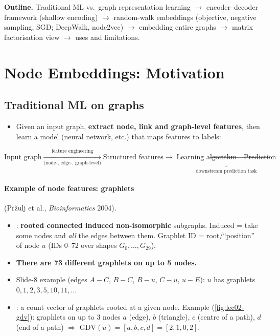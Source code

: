 \label{ch:lec02}

\textbf{Outline.} Traditional ML vs.\ graph representation learning $\to$
encoder--decoder framework (shallow encoding) $\to$ random-walk embeddings
(objective, negative sampling, SGD; DeepWalk, node2vec) $\to$ embedding entire
graphs $\to$ matrix factorisation view $\to$ uses and limitations.

\section{Node Embeddings: Motivation}\label{sec:lec02-motivation}

\subsection{Traditional ML on graphs}\label{sec:lec02-traditional}

\begin{itemize}
  \item Given an input graph, \textbf{extract node, link and graph-level
    features}, then learn a model (neural network, etc.) that maps features to
    labels:
\end{itemize}
\[
  \text{Input graph}
  \xrightarrow[\text{(node-, edge-, graph-level)}]{\text{feature engineering}}
  \text{Structured features}\to
  \underbrace{\text{Learning algorithm}\to\text{Prediction}}_{\text{downstream prediction task}}
\]

\paragraph{Example of node features: graphlets} (Pr\v{z}ulj et al.,
\emph{Bioinformatics} 2004).
\begin{itemize}
  \item {}: \textbf{rooted connected induced non-isomorphic}
    subgraphs. Induced = take some nodes and \emph{all} the edges between them.
    Graphlet ID = root/``position'' of node $u$ (IDs $0$--$72$ over shapes
    $G_0,\dots,G_{29}$).
  \item \textbf{There are 73 different graphlets on up to 5 nodes.}
  \item Slide-8 example (edges $A\!-\!C$, $B\!-\!C$, $B\!-\!u$, $C\!-\!u$,
    $u\!-\!E$): $u$ has graphlets $0,1,2,3,5,10,11,\ldots$
  \item {}: a count vector of graphlets rooted
    at a given node. Example (\cref{fig:lec02-gdv}): graphlets on up to 3 nodes
    $a$ (edge), $b$ (triangle), $c$ (centre of a path), $d$ (end of a path)
    $\Rightarrow$ $\mathrm{GDV}(u)=[a,b,c,d]=[2,1,0,2]$.
\end{itemize}

